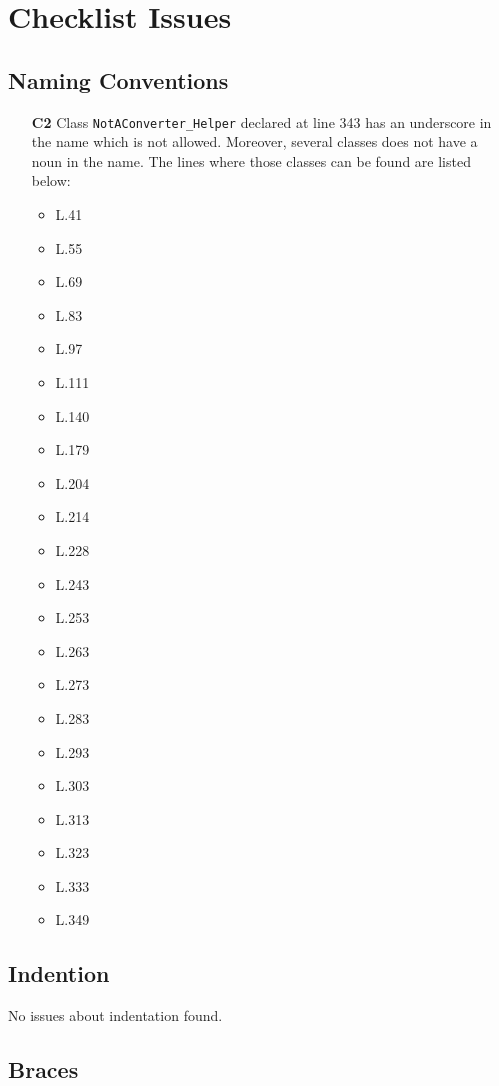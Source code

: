 \section{Checklist Issues}

\subsection{Naming Conventions}
	\begin{itemize}
		\item[\textbf{C2}] Class \texttt{NotAConverter\_Helper} declared at line 343 has an underscore in the name which is not allowed. Moreover, several classes does not have a noun in the name. The lines where those classes can be found are listed below:
		\begin{itemize}
			\item L.41
			\item L.55
			\item L.69
			\item L.83
			\item L.97
			\item L.111
			\item L.140
			\item L.179
			\item L.204
			\item L.214
			\item L.228
			\item L.243
			\item L.253
			\item L.263
			\item L.273
			\item L.283
			\item L.293
			\item L.303
			\item L.313
			\item L.323
			\item L.333
			\item L.349
		\end{itemize}
	\end{itemize}

\subsection{Indention}
No issues about indentation found.

\subsection{Braces}
\blindtext


